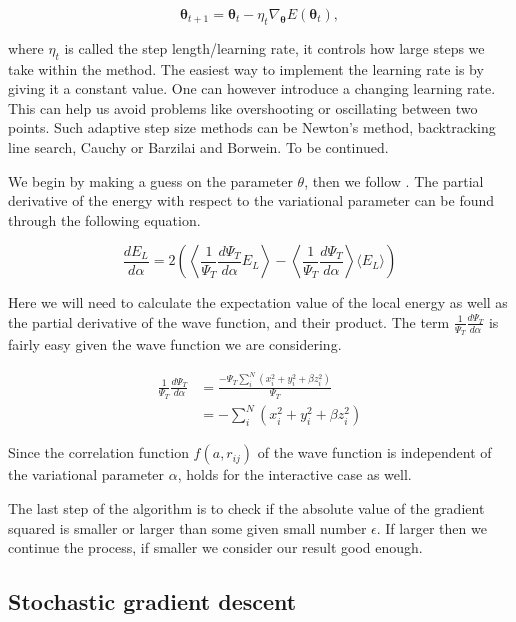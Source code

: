 \begin{equation} \label{eq:theta}
\mathbf{\theta}_{t+1} = \mathbf{\theta}_t - \eta_t \nabla_{\mathbf{\theta}} E(\mathbf{\theta}_t),
\end{equation}

where $\eta_t$ is called the step length/learning rate, it controls how large steps we take within the method.
The easiest way to implement the learning rate is by giving it a constant value. One can however introduce a changing learning rate. This can help us avoid problems like overshooting or oscillating between two points. Such adaptive step size methods can be Newton's method, backtracking line search, Cauchy or Barzilai and Borwein. To be continued. 

We begin by making a guess on the parameter $\theta$, then we follow . The partial derivative of the energy with respect to the variational parameter can be found through the following equation.

\begin{equation} \label{eq:energy_gradient}
\frac{dE_L}{d\alpha} = 2 \left( \left\langle \frac{1}{\Psi_T}\frac{d \Psi_T}{d \alpha} E_L \right\rangle  - \left\langle  \frac{1}{\Psi_T}\frac{d \Psi_T}{d \alpha} \right\rangle \langle E_L \rangle \right)
\end{equation}

Here we will need to calculate the expectation value of the local energy as well as the partial derivative of the wave function, and their product. The term $\frac{1}{\Psi_T}\frac{d \Psi_T}{d \alpha}$ is fairly easy given the wave function we are considering. 

\begin{align} 
\frac{1}{\Psi_T}\frac{d \Psi_T}{d \alpha} &= \frac{-\Psi_T \sum_i^N (x_i^2 + y_i^2 + \beta z^2_i)}{\Psi_T} \\
&= -\sum_i^N (x_i^2 + y_i^2 + \beta z^2_i) \label{eq:frac_deri_wf}
\end{align}

Since the correlation function $f(a, r_{ij})$ of the wave function is independent of the variational parameter $\alpha$,  holds for the interactive case as well.

The last step of the algorithm is to check if the absolute value of the gradient squared is smaller or larger than some given small number $\epsilon$. If larger then we continue the process, if smaller we consider our result good enough. 

\subsection{Stochastic gradient descent}

